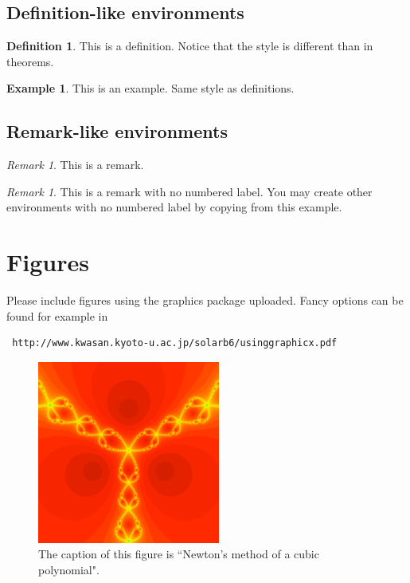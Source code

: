 \documentclass[12,twoside]{TFG-GM}
\theoremstyle{definition}
\newtheorem{definition}[theorem]{Definition}
\newtheorem{example}[theorem]{Example}
\theoremstyle{remark}
\newtheorem{remark}[theorem]{Remark}
\newtheorem*{remarknonumber}{Remark}
\begin{document}
\subsection{Definition-like environments}

\begin{definition}
This is a definition. Notice that the style is different than in theorems.
\end{definition}

\begin{example}
This is an example. Same style as definitions.
\end{example}

\subsection{Remark-like environments}

\begin{remark}
This is a remark. 
\end{remark}

\begin{remarknonumber}
This is a remark with no numbered label. You may create other environments with no numbered label by copying from this example.
\end{remarknonumber}

\section{Figures}

Please include figures using the graphics package uploaded.  Fancy options can be found for example in  \begin{verbatim} http://www.kwasan.kyoto-u.ac.jp/solarb6/usinggraphicx.pdf \end{verbatim}

\begin{figure}[htb!]
\begin{center}
\includegraphics[width=6cm]{samplefigure.pdf}
\end{center}
\caption{\label{sample figure} \small The caption of this figure is ``Newton's method of a cubic polynomial".}
\end{figure}
\end{document}

